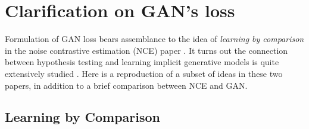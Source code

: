 \documentclass[11pt]{article}
\begin{document}
\newpage
\section{Clarification on GAN's loss} \label{sec:gan_loss}

Formulation of GAN loss bears assemblance to the idea of \textit{learning by comparison} in the noise contrastive estimation (NCE) paper \cite{gutmannNoisecontrastiveEstimationNew2010}. It turns out the connection between hypothesis testing and learning implicit generative models is quite extensively studied \cite{mohamedLearningImplicitGenerative2017}. Here is a reproduction of a subset of ideas in these two papers, in addition to a brief comparison between NCE and GAN. 

\subsection{Learning by Comparison}
\end{document}
